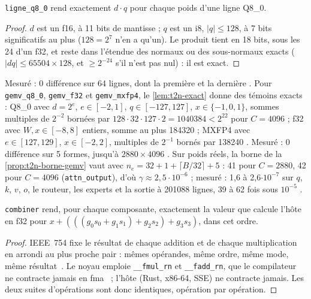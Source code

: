 \begin{proposition}\label{prop:t2n-ligne}
\texttt{ligne\_q8\_0} rend exactement $d \cdot q$ pour chaque poids d'une ligne Q8\_0.
\end{proposition}

\begin{proof}
$d$ est un f16, à 11 bits de mantisse ; $q$ est un i8, $|q| \le 128$, à 7 bits significatifs au plus ($128 = 2^7$ n'en a qu'un). Le produit tient en 18 bits, sous les 24 d'un f32, et reste dans l'étendue des normaux ou des sous-normaux exacts ($|d q| \le \num{65504} \times 128$, et $\ge 2^{-24}$ s'il n'est pas nul) : il est exact.
\end{proof}

Mesuré : 0 différence sur 64 lignes, dont la première et la dernière \mes. Pour \texttt{gemv\_q8\_0}, \texttt{gemv\_f32} et \texttt{gemv\_mxfp4}, le \cref{lem:t2n-exact} donne des témoins exacts : Q8\_0 avec $d = 2^e$, $e \in [-2, 1]$, $q \in [-127, 127]$, $x \in \{-1, 0, 1\}$, sommes multiples de $2^{-2}$ bornées par $128 \cdot 32 \cdot 127 \cdot 2 = \num{1040384} < 2^{22}$ pour $C = \num{4096}$ ; f32 avec $W, x \in [-8, 8]$ entiers, somme au plus \num{184320} ; MXFP4 avec $e \in [127, 129]$, $x \in [-2, 2]$, multiples de $2^{-1}$ bornés par \num{138240} \calc. Mesuré : 0 différence sur 5 formes, jusqu'à $\num{2880} \times \num{4096}$ \mes. Sur poids réels, la borne de la \cref{prop:t2n-borne-gemv} vaut avec $n_e = 32 + 1 + \lceil B/32 \rceil + 5$ : 41 pour $C = \num{2880}$, 42 pour $C = \num{4096}$ (\texttt{attn\_output}), d'où $\gamma \approx 2{,}5\cdot10^{-6}$ ; mesuré : 1,6 à 2,6$\cdot10^{-7}$ sur $q$, $k$, $v$, $o$, le routeur, les experts et la sortie à \num{201088} lignes, 39 à 62 fois sous $10^{-5}$ \mes.

\begin{proposition}\label{prop:t2n-combiner}
\texttt{combiner} rend, pour chaque composante, exactement la valeur que calcule l'hôte en f32 pour $x + (((g_0 s_0 + g_1 s_1) + g_2 s_2) + g_3 s_3)$, dans cet ordre.
\end{proposition}

\begin{proof}
IEEE~754 fixe le résultat de chaque addition et de chaque multiplication en arrondi au plus proche pair : mêmes opérandes, même ordre, même mode, même résultat~\cite{ieee754-2019}. Le noyau emploie \texttt{\_\_fmul\_rn} et \texttt{\_\_fadd\_rn}, que le compilateur ne contracte jamais en fma~\cite{nvidia2026intrinseques} ; l'hôte (Rust, x86-64, SSE) ne contracte jamais. Les deux suites d'opérations sont donc identiques, opération par opération.
\end{proof}

